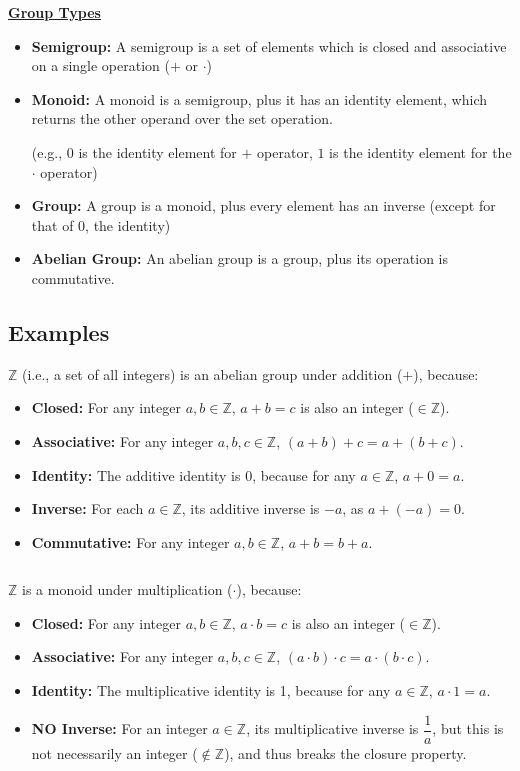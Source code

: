 \begin{tcolorbox}[title={\textbf{\tboxdef{\ref*{subsec:group-def}} Group}}]
$ $

\noindent \textbf{\underline{Group Types}}
\begin{itemize}
\item \textbf{Semigroup:} A semigroup is a set of elements which is closed and associative on a single operation ($+$ or $\cdot$)
\item \textbf{Monoid:} A monoid is a semigroup, plus it has an identity element, which returns the other operand over the set operation.

(e.g., $0$ is the identity element for $+$ operator, $1$ is the identity element for the $\cdot$ operator)
\item \textbf{Group:} A group is a monoid, plus every element has an inverse (except for that of 0, the identity)
\item \textbf{Abelian Group:} An abelian group is a group, plus its operation is commutative.
\end{itemize}
\end{tcolorbox}

\subsection{Examples}
\label{subsec:group-ex}

$\mathbb{Z}$ (i.e., a set of all integers) is an abelian group under addition ($+$), because:
\begin{itemize}
\item \textbf{Closed:} For any integer $a, b \in \mathbb{Z}$, $a + b = c$ is also an integer ($\in \mathbb{Z}$).
\item \textbf{Associative:} For any integer $a, b, c \in \mathbb{Z}$, $(a + b) + c = a + (b + c)$.
\item \textbf{Identity:} The additive identity is 0, because for any $a \in \mathbb{Z}$, $a + 0 = a$.
\item \textbf{Inverse:} For each $a \in \mathbb{Z}$, its additive inverse is $-a$, as $a + (-a) = 0$.
\item \textbf{Commutative: } For any integer $a, b \in \mathbb{Z}$, $a + b = b + a$.
\end{itemize}

$ $

\noindent $\mathbb{Z}$ is a monoid under multiplication ($\cdot$), because:
\begin{itemize}
\item \textbf{Closed:} For any integer $a, b \in \mathbb{Z}$, $a \cdot b = c$ is also an integer ($\in \mathbb{Z}$).
\item \textbf{Associative:} For any integer $a, b, c \in \mathbb{Z}$, $(a \cdot b) \cdot c = a \cdot (b \cdot c)$.
\item \textbf{Identity:} The multiplicative identity is 1, because for any $a \in \mathbb{Z}$, $a \cdot 1 = a$.
\item \textbf{NO Inverse:} For an integer $a \in \mathbb{Z}$, its multiplicative inverse is $\dfrac{1}{a}$, but this is not necessarily an integer ($\not\in \mathbb{Z}$), and thus breaks the closure property.
\end{itemize}
$ $

